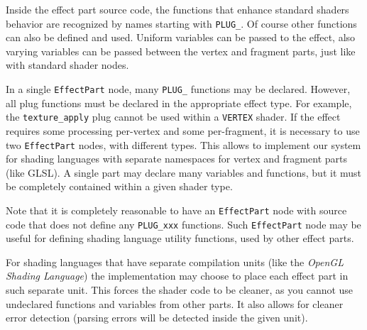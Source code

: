 \documentclass{egpubl}
\begin{document}
Inside the effect part source code, the functions that enhance
standard shaders behavior are recognized by names starting with \texttt{PLUG\_}.
Of course other functions can also be defined and used.
Uniform variables can be passed to the effect,
also varying variables can be passed between the vertex and fragment
parts, just like with standard shader nodes.

In a single \texttt{EffectPart} node, many \texttt{PLUG\_}
functions may be declared. However, all plug functions must be declared in the appropriate
effect type. For example, the \texttt{texture\_apply} plug cannot be used
within a \texttt{VERTEX} shader.
If the effect requires some processing per-vertex and some per-fragment,
it is necessary to use two \texttt{EffectPart} nodes, with different types.
This allows to implement our system for
shading languages with
separate namespaces for vertex and fragment parts (like GLSL).
A single part may declare many variables and functions,
but it must be completely contained within a given shader type.

Note that it is completely reasonable to have an \texttt{EffectPart} node
with source code that does not define any \texttt{PLUG\_xxx} functions.
Such \texttt{EffectPart} node may be useful for defining shading language
utility functions, used by other effect parts.

For shading languages that have separate compilation units
(like the \emph{OpenGL Shading Language}) the implementation may choose to place
each effect part in such separate unit. This forces the shader code to be
cleaner, as you cannot use undeclared functions and variables from other parts.
It also allows for cleaner error detection (parsing errors will be detected
inside the given unit).

\end{document}
